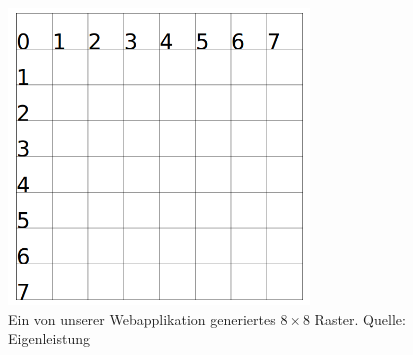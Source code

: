 \documentclass[12pt,a4paper,german]{report}
\begin{document}
\begin{figure}[H]
  \centering
  \includegraphics[width=8cm]{grid1}
  \caption[Ein von unserer Webapplikation generiertes $8\times8$ Raster.]{Ein von unserer Webapplikation generiertes $8\times8$ Raster. Quelle: Eigenleistung}
  \label{fig:grid1}
\end{figure}
\end{document}
